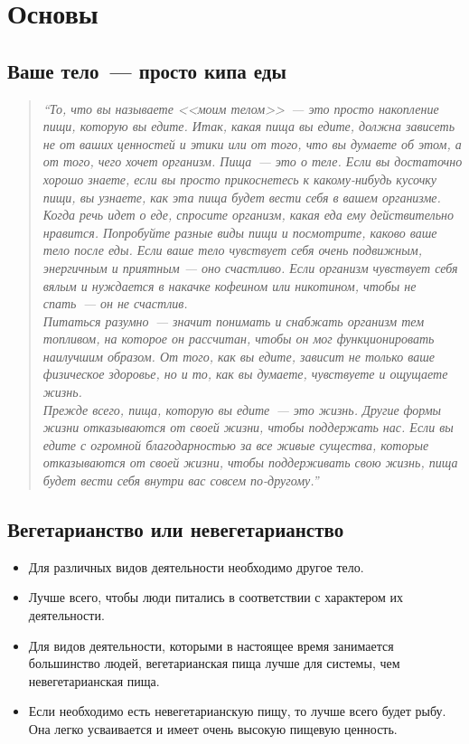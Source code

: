 \chapter{Основы}

\section{Ваше тело~--- просто кипа еды}
\begin{quote}
\textit{``То, что вы называете <<моим телом>>~--- это просто накопление пищи, которую вы едите. Итак, какая пища вы едите, должна зависеть не от ваших ценностей и этики или от того, что вы думаете об этом, а от того, чего хочет организм. Пища~--- это о теле. Если вы достаточно хорошо знаете, если вы просто прикоснетесь к какому-нибудь кусочку пищи, вы узнаете, как эта пища будет вести себя в вашем организме.
\\[3pt]
Когда речь идет о еде, спросите организм, какая еда ему действительно нравится. Попробуйте разные виды пищи и посмотрите, каково ваше тело после еды. Если ваше тело чувствует себя очень подвижным, энергичным и приятным --- оно счастливо. Если организм чувствует себя вялым и нуждается в накачке кофеином или никотином, чтобы не спать~--- он не счастлив.
\\[3pt]
Питаться разумно~--- значит понимать и снабжать организм тем топливом, на которое он рассчитан, чтобы он мог функционировать наилучшим образом. От того, как вы едите, зависит не только ваше физическое здоровье, но и то, как вы думаете, чувствуете и ощущаете жизнь.
\\[3pt]
Прежде всего, пища, которую вы едите~--- это жизнь. Другие формы жизни отказываются от своей жизни, чтобы поддержать нас. Если вы едите с огромной благодарностью за все живые существа, которые отказываются от своей жизни, чтобы поддерживать свою жизнь, пища будет вести себя внутри вас совсем по-другому.''
\\[5pt]
}
\end{quote}

\section{Вегетарианство или невегетарианство}
\begin{itemize}
\item Для различных видов деятельности необходимо другое тело.
\item Лучше всего, чтобы люди питались в соответствии с характером их деятельности.
\item Для видов деятельности, которыми в настоящее время занимается большинство людей, вегетарианская пища лучше для системы, чем невегетарианская пища.
\item Если необходимо есть невегетарианскую пищу, то лучше всего будет рыбу. Она легко усваивается и имеет очень высокую пищевую ценность.
\end{itemize}




